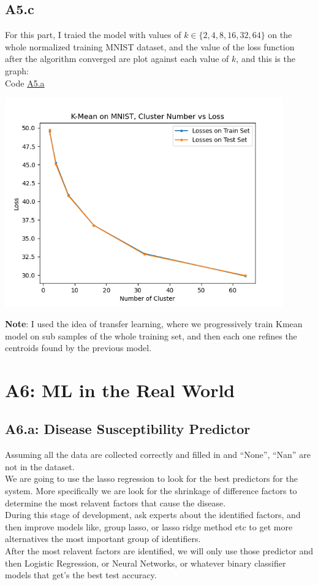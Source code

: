 \documentclass[]{article}
\begin{document}
    \subsection*{A5.c}
        For this part, I traied the model with values of $k\in \{2, 4, 8, 16, 32, 64\}$ on the whole normalized training MNIST dataset, and the value of the loss function after the algorithm converged are plot against each value of $k$, and this is the graph: 
        \\
        Code \hyperref[A5.a]{A5.a}
        \begin{center}
            \includegraphics*[width=12cm]{A5bplots/15-46-26-A5b-k-vs-loss.png}
        \end{center}
        \textbf{Note}: I used the idea of transfer learning, where we progressively train Kmean model on sub samples of the whole training set, and then each one refines the centroids found by the previous model. 
    
        
        
\section*{A6: ML in the Real World}
    \subsection*{A6.a: Disease Susceptibility Predictor}
        Assuming all the data are collected correctly and filled in and ``None'', ``Nan'' are not in the dataset. 
        \\[1.1em]
        We are going to use the lasso regression to look for the best predictors for the system. More specifically we are look for the shrinkage of difference factors to determine the most relavent factors that cause the disease. 
        \\[1.1em]
        During this stage of development, ask experts about the identified factors, and then improve models like, group lasso, or lasso ridge method etc to get more alternatives the most important group of identifiers. 
        \\[1.1em]
        After the most relavent factors are identified, we will only use those predictor and then Logistic Regression, or Neural Networks, or whatever binary classifier models that get's the best test accuracy. 
\end{document}
